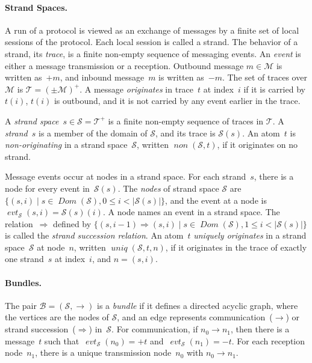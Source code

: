 \documentclass[12pt]{article}
\newcommand{\fn}[1]{\ensuremath{\operatorname{\mathit{#1}}}}
\newcommand{\sdom}{\fn{Dom}}
\newcommand{\inbnd}{\mathord -}
\newcommand{\outbnd}{\mathord +}
\newcommand{\msg}{\ensuremath{\mathcal{M}}}
\newcommand{\trc}{\ensuremath{\mathcal{T}}}
\newcommand{\ssp}{\ensuremath{\mathcal{S}}}
\newcommand{\bun}{\ensuremath{\mathcal{B}}}
\newcommand{\evt}{\fn{evt}}
\begin{document}
\paragraph{Strand Spaces.}
A run of a protocol is viewed as an exchange of messages by a finite
set of local sessions of the protocol.  Each local session is called a
strand.  The behavior of a strand, its \emph{trace}, is a
finite non-empty sequence of messaging events.  An \emph{event} is
either a message transmission or a reception.  Outbound message
$m\in\msg$ is written as~$\outbnd m$, and inbound message~$m$ is
written as~$\inbnd m$.  The set of traces over $\msg$ is
$\trc=(\pm\msg)^+$.  A message \emph{originates} in trace~$t$ at
index~$i$ if it is carried by $t(i)$, $t(i)$ is outbound, and it is
not carried by any event earlier in the trace.

A \emph{strand space}~$s\in\ssp=\trc^+$ is a finite non-empty sequence
of traces in $\trc$.  A \emph{strand}~$s$ is a member of the domain of
$\ssp$, and its trace is $\ssp(s)$.  An atom~$t$ is
\emph{non-originating} in a strand
space~$\ssp$, written \index{non@\fn{non}}$\fn{non}(\ssp,t)$, if it
originates on no strand.

Message events occur at nodes in a strand space.  For each strand~$s$,
there is a node for every event in~$\ssp(s)$.  The
\emph{nodes} of strand space $\ssp$ are $\{(s,i)\mid
s\in\sdom(\ssp), 0\leq i < |\ssp(s)|\}$, and the event at a node
is $\evt_\ssp(s,i)=\ssp(s)(i)$.  A node names an event in a strand
space.  The relation~$\Rightarrow$ defined by
$\{(s,i-1)\Rightarrow(s,i)\mid s\in\sdom(\ssp), 1\leq
i<|\ssp(s)|\}$ is called the \emph{strand
  succession relation}.  An atom~$t$ \emph{uniquely originates} in a strand space~$\ssp$ at
node~$n$, written \index{uniq@\fn{uniq}}$\fn{uniq}(\ssp,t,n)$, if it
originates in the trace of exactly one strand~$s$ at index~$i$, and
$n=(s,i)$.

\paragraph{Bundles.}
The pair $\bun=(\ssp,\to)$ is a \emph{bundle} if
it defines a directed acyclic graph, where the vertices are the nodes
of $\ssp$, and an edge represents communication~($\rightarrow$) or
strand succession~($\Rightarrow$) in~$\ssp$.  For communication, if
$n_0\rightarrow n_1$, then there is a message~$t$ such
that~$\evt_\ssp(n_0)=\outbnd t$ and~$\evt_\ssp(n_1)=\inbnd t$.
For each reception node~$n_1$, there is a unique transmission
node~$n_0$ with $n_0\rightarrow n_1$.
\end{document}
